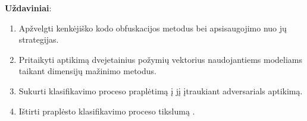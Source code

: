 \vspace{10pt}
\textbf{Uždaviniai}:
\begin{enumerate}
    \item Apžvelgti kenkėjiško kodo obfuskacijos metodus bei apsisaugojimo nuo jų strategijas.
    \item Pritaikyti  aptikimą dvejetainius požymių vektorius naudojantiems modeliams taikant dimensijų mažinimo metodus.
    \item Sukurti klasifikavimo proceso praplėtimą į jį įtraukiant \glspl{adversarial} aptikimą.
    \item Ištirti praplėsto klasifikavimo proceso tikslumą .
\end{enumerate}